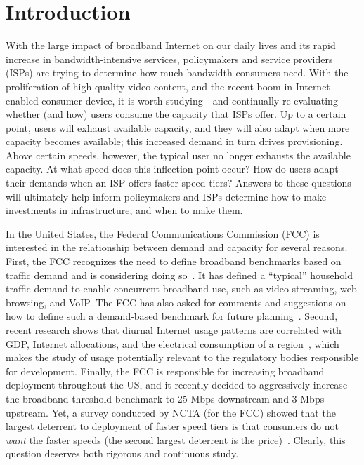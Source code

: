 \section{Introduction}\label{sec:introduction}

With the large impact of broadband Internet on our daily lives and its
rapid increase in bandwidth-intensive services, policymakers and service
providers (ISPs) are trying to determine how much bandwidth consumers
need. With the proliferation of high quality video content, and the
recent boom in Internet-enabled consumer device, it is worth
studying---and continually re-evaluating---whether (and how) users
consume the capacity that ISPs offer.  Up to a certain point, users will
exhaust available capacity, and they will also adapt when more capacity
becomes available; this increased demand in turn drives provisioning.
Above certain speeds, however, the typical user no longer exhausts the
available capacity. At what speed does this inflection point occur?  How
do users adapt their demands when an ISP offers faster speed tiers?
Answers to these questions will ultimately help inform policymakers and
ISPs determine how to make investments in infrastructure, and when to
make them.

In the United States, the Federal Communications Commission (FCC) is
interested in the relationship between demand and capacity for several
reasons.  First, the FCC recognizes the need to define broadband
benchmarks based on traffic demand and is considering doing
so~\cite{fcc2015broadband-report}. It has defined a ``typical''
household traffic demand to enable concurrent broadband use, such as
video streaming, web browsing, and VoIP. The FCC has also asked
for comments and suggestions on how to define such a demand-based
benchmark for future planning~\cite{fcc2015progress-report,
  fcc2014progress-report}.  Second, recent research shows that diurnal
Internet usage patterns are correlated with GDP, Internet allocations,
and the electrical consumption of a
region~\cite{ant-diurnal-web}, which makes the study of usage potentially
relevant to the regulatory bodies responsible for development.  Finally,
the FCC is responsible for increasing broadband deployment throughout
the US, and it recently decided to aggressively increase the broadband
threshold benchmark to 25 Mbps downstream and 3 Mbps upstream.  Yet, a
survey conducted by NCTA (for the FCC) showed that the largest deterrent
to deployment of faster speed tiers is that consumers do not \emph{want}
the faster speeds (the second largest deterrent is the
price)~\cite{fcc2015progress-report}. Clearly, this question deserves
both rigorous and continuous study.

